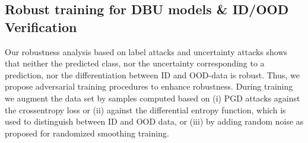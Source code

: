 \subsection{Robust training for DBU models \& ID/OOD Verification}

Our robustness analysis based on label attacks and uncertainty attacks shows that neither the predicted class, nor the uncertainty corresponding to a prediction, nor the differentiation between ID and OOD-data is robust. 
Thus, we propose adversarial training  procedures to enhance robustness. During training we augment the data set by samples computed based on (i) PGD attacks against the crossentropy loss or (ii) against the differential entropy function, which is used to distinguish between ID and OOD data, or (iii) by adding random noise as proposed for randomized smoothing training. 


